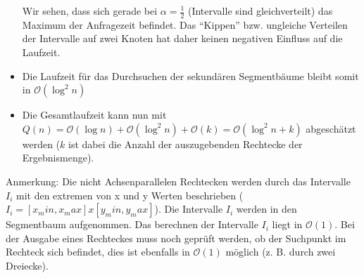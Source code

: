 \documentclass[a4paper]{article}
\begin{document}
\begin{itemize}
	Wir sehen, dass sich gerade bei $\alpha = \frac{1}{2}$ (Intervalle sind gleichverteilt) das Maximum der Anfragezeit befindet. 
Das "`Kippen"' bzw. ungleiche Verteilen der Intervalle auf zwei Knoten hat daher keinen negativen
Einfluss auf die Laufzeit. 

	\item Die Laufzeit für das Durchsuchen der sekundären Segmentbäume bleibt somit in 
	 $\mathcal{O}(\log^2 n)$
	
\item Die Gesamtlaufzeit kann nun mit $Q(n) = \mathcal{O}(\log n) + \mathcal{O}(\log^2 n) + \mathcal{O}(k)
= \mathcal{O}(\log^2 n + k)$ abgeschätzt werden ($k$ ist dabei die Anzahl der auszugebenden Rechtecke
der Ergebnismenge).
\end{itemize}

Anmerkung: Die nicht Achsenparallelen Rechtecken werden durch das Intervalle $I_i$ mit den extremen von x und y Werten beschrieben ($I_i = [x_min, x_max] x [y_min, y_max]$). Die Intervalle $I_i$ werden in den Segmentbaum aufgenommen. Das berechnen der Intervalle $I_i$ liegt in $\mathcal{O}(1)$. Bei der Ausgabe eines Rechteckes muss noch geprüft werden, ob der Suchpunkt im Rechteck sich befindet, dies ist ebenfalls in $\mathcal{O}(1)$ möglich (z. B. durch zwei Dreiecke).
\end{document}
